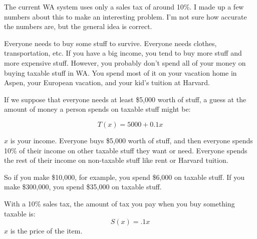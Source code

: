 \documentclass[fleqn,addpoints]{exam}
\begin{document}
\begin{questions}
\question
The current WA system uses only a sales tax of around 10\%.  I made up a few numbers about this to make an interesting
problem.  I'm not sure how accurate the numbers are, but the general idea is correct.

Everyone needs to buy some stuff to survive.  Everyone needs clothes, transportation, etc.  If you have a big income,
you tend to buy more stuff and more expensive stuff.  However, you probably don't spend all of your money on buying
taxable stuff in WA.  You spend most of it on your vacation home in Aspen, your European vacation, and your kid's
tuition at Harvard.  

If we suppose that everyone needs at least \$5,000 worth of stuff, a guess at the amount of money a person spends on
taxable stuff might be:

\[
  T(x) = 5000 + 0.1x
\]

$x$ is your income.  Everyone buys \$5,000 worth of stuff, and then everyone spends 10\% of their income on other
taxable stuff they want or need.  Everyone spends the rest of their income on non-taxable stuff like rent or
Harvard tuition.

So if you make \$10,000, for example, you spend \$6,000 on taxable stuff.  If you make \$300,000, you spend \$35,000 on
taxable stuff.

With a 10\% sales tax, the amount of tax you pay when you buy something taxable is:
\[
  S(x) = .1x
\]
$x$ is the price of the item.

\end{questions}
\end{document}
